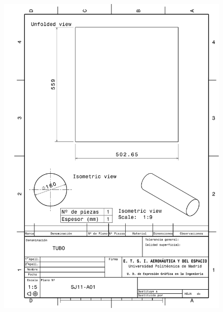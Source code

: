 \begin{figure}
    \centering
    \includegraphics[width=\linewidth]{Figures//Planos/TUB.pdf}
\end{figure}